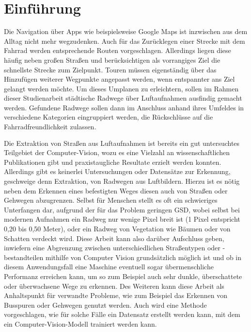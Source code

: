\chapter{Einführung}

Die Navigation über Apps wie beispielsweise Google Maps ist inzwischen aus dem Alltag nicht mehr wegzudenken.
Auch für das Zurücklegen einer Strecke mit dem Fahrrad werden entsprechende Routen vorgeschlagen.
Allerdings liegen diese häufig neben großen Straßen und berücksichtigen als vorrangiges Ziel die schnellste Strecke zum Zielpunkt.
Touren müssen eigenständig über das Hinzufügen weiterer Wegpunkte angepasst werden, wenn entspannter ans Ziel gelangt werden möchte.
Um dieses Umplanen zu erleichtern, sollen im Rahmen dieser Studienarbeit städtische Radwege über Luftaufnahmen ausfindig gemacht werden.
Gefundene Radwege sollen dann im Anschluss anhand ihres Umfeldes in verschiedene Kategorien eingruppiert werden, die Rückschlüsse auf die Fahrradfreundlichkeit zulassen.

Die Extraktion von Straßen aus Luftaufnahmen ist bereits
ein gut untersuchtes Teilgebiet der Computer-Vision, wozu es eine Vielzahl an wissenschaftlichen Publikationen gibt
und praxistaugliche Resultate erzielt werden konnten. \\
Allerdings gibt es keinerlei Untersuchungen oder Datensätze zur Erkennung, geschweige denn Extraktion, 
von Radwegen aus Luftbildern. Hierzu ist es nötig neben dem Erkennen eines befestigten Weges  
diesen auch von Straßen oder Gehwegen abzugrenzen. Selbst für 
Menschen stellt es oft ein schwieriges Unterfangen dar, aufgrund der für das Problem geringen \ac{GSD}, wobei selbst bei modernen 
Aufnahmen ein Radweg nur wenige Pixel breit ist (1 Pixel entspricht 0,20 bis 0,50 Meter), oder ein Radweg von Vegetation wie Bäumen oder von Schatten verdeckt wird.
Diese Arbeit kann also darüber Aufschluss geben, inwiefern eine Abgrenzung zwischen unterschiedlichen Straßentypen oder -bestandteilen mithilfe von Computer Vision
grundsätzlich möglich ist und ob in diesem Anwendungsfall eine Maschine eventuell sogar übermenschliche Performanz 
erreichen kann, um so zum Beispiel auch sehr dunkle, überschattete oder überwachsene Wege zu erkennen. 
Des Weiteren kann diese Arbeit als Anhaltspunkt für verwandte Probleme, wie zum Beispiel das Erkennen von Busspuren 
oder Gehwegen genutzt werden. Auch wird eine Methode vorgeschlagen, wie für solche Fälle ein Datensatz erstellt werden 
kann, mit dem ein Computer-Vision-Modell trainiert werden kann. 


